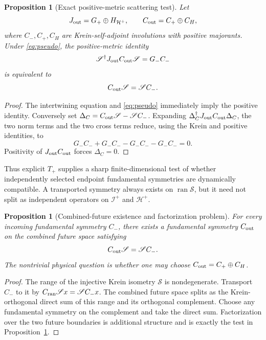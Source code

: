 \documentclass[11pt]{article}
\newtheorem{proposition}[theorem]{Proposition}
\theoremstyle{definition}
\theoremstyle{remark}
\begin{document}
\begin{proposition}[Exact positive-metric scattering test]
\label{prop:c-scattering}
Let
\[
J_{\rm out}=G_+\oplus H_{\mathcal H^+},
\qquad
C_{\rm out}=C_+\oplus C_H,
\]
where \(C_-,C_+,C_H\) are Krein-self-adjoint involutions with positive
majorants.  Under \eqref{eq:pseudo}, the positive-metric identity
\[
\mathscr S^\dagger J_{\rm out}C_{\rm out}\mathscr S
=G_-C_-
\]
is equivalent to
\[
C_{\rm out}\mathscr S=\mathscr S C_-.
\]
\end{proposition}

\begin{proof}
The intertwining equation and \eqref{eq:pseudo} immediately imply the
positive identity.  Conversely set
\(\Delta_C=C_{\rm out}\mathscr S-\mathscr S C_-\).  Expanding
\(\Delta_C^\dagger J_{\rm out}C_{\rm out}\Delta_C\), the two norm terms
and the two cross terms reduce, using the Krein and positive identities, to
\[
G_-C_-+G_-C_--G_-C_--G_-C_-=0.
\]
Positivity of \(J_{\rm out}C_{\rm out}\) forces \(\Delta_C=0\).
\end{proof}

Thus explicit \(T_+\) supplies a sharp finite-dimensional test of whether
independently selected endpoint fundamental symmetries are dynamically
compatible.  A transported symmetry always exists on
\(\operatorname{ran}\mathscr S\), but it need not split as independent
operators on \(\mathscr I^+\) and \(\mathcal H^+\).

\begin{proposition}[Combined-future existence and factorization problem]
\label{prop:combined-future-c}
For every incoming fundamental symmetry \(C_-\), there exists a fundamental
symmetry \(C_{\rm out}\) on the combined future space satisfying
\[
C_{\rm out}\mathscr S=\mathscr S C_-.
\]
The nontrivial physical question is whether one may choose
\(C_{\rm out}=C_+\oplus C_H\).
\end{proposition}

\begin{proof}
The range of the injective Krein isometry \(\mathscr S\) is nondegenerate.
Transport \(C_-\) to it by
\(C_{\rm ran}\mathscr Sx=\mathscr S C_-x\).  The combined future space
splits as the Krein-orthogonal direct sum of this range and its orthogonal
complement.  Choose any fundamental symmetry on the complement and take the
direct sum.  Factorization over the two future boundaries is additional
structure and is exactly the test in Proposition~\ref{prop:c-scattering}.
\end{proof}
\end{document}
